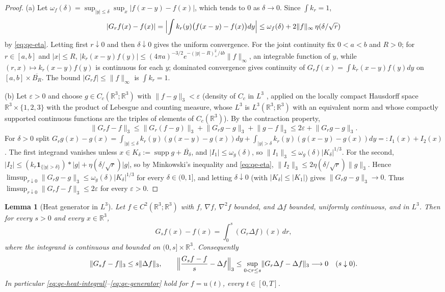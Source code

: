 \documentclass[11pt]{article}
\newtheorem{lemma}[theorem]{Lemma}
\theoremstyle{definition}
\theoremstyle{plain}
\newcommand{\R}{\mathbb R}
\newcommand{\norm}[1]{\lVert #1\rVert}
\begin{document}
\begin{proof}
(a) Let $\omega_f(\delta)=\sup_{|y|\le\delta}\sup_x|f(x-y)-f(x)|$, which
tends to $0$ as $\delta\to0$.  Since $\int k_r=1$,
\[
 |G_rf(x)-f(x)|
 =\Bigl|\int k_r(y)\bigl(f(x-y)-f(x)\bigr)dy\Bigr|
 \le\omega_f(\delta)+2\norm f_\infty\,\eta(\delta/\sqrt r)
\]
by \eqref{eq:qe-eta}.  Letting first $r\downarrow0$ and then
$\delta\downarrow0$ gives the uniform convergence.  For the joint
continuity fix $0<a<b$ and $R>0$; for $r\in[a,b]$ and $|x|\le R$,
$|k_r(x-y)f(y)|\le(4\pi a)^{-3/2}e^{-(|y|-R)_+^2/4b}\norm f_\infty$, an
integrable function of $y$, while $(r,x)\mapsto k_r(x-y)f(y)$ is
continuous for each $y$; dominated convergence gives continuity of
$G_rf(x)=\int k_r(x-y)f(y)dy$ on $[a,b]\times\overline{B_R}$.  The bound
$|G_rf|\le\norm f_\infty$ is $\int k_r=1$.

(b) Let $\varepsilon>0$ and choose $g\in C_c(\R^3;\R^3)$ with
$\norm{f-g}_3<\varepsilon$ (density of $C_c$ in $L^3$
\cite[Thm.~3.14]{Rudin1987}, applied on
the locally compact Hausdorff space $\R^3\times\{1,2,3\}$ with the
product of Lebesgue and counting measure, whose $L^3$ is
$L^3(\R^3;\R^3)$ with an equivalent norm and whose compactly
supported continuous functions are the triples of elements of
$C_c(\R^3)$).  By the contraction property,
\[
 \norm{G_rf-f}_3
 \le\norm{G_r(f-g)}_3+\norm{G_rg-g}_3+\norm{g-f}_3
 \le2\varepsilon+\norm{G_rg-g}_3 .
\]
For $\delta>0$ split
$G_rg(x)-g(x)=\int_{|y|\le\delta}k_r(y)(g(x-y)-g(x))dy
+\int_{|y|>\delta}k_r(y)(g(x-y)-g(x))dy=:I_1(x)+I_2(x)$.
The first integrand vanishes unless $x\in K_\delta:=\operatorname{supp}g+\overline{B_\delta}$,
and $|I_1|\le\omega_g(\delta)$, so
$\norm{I_1}_3\le\omega_g(\delta)|K_\delta|^{1/3}$.  For the second,
$|I_2|\le(k_r\mathbf 1_{\{|y|>\delta\}})*|g|+\eta(\delta/\sqrt r)|g|$, so by
Minkowski's inequality and \eqref{eq:qe-eta},
$\norm{I_2}_3\le2\eta(\delta/\sqrt r)\norm g_3$.  Hence
$\limsup_{r\downarrow0}\norm{G_rg-g}_3\le\omega_g(\delta)|K_\delta|^{1/3}$
for every $\delta\in(0,1]$, and letting $\delta\downarrow0$ (with
$|K_\delta|\le|K_1|$) gives $\norm{G_rg-g}_3\to0$.  Thus
$\limsup_{r\downarrow0}\norm{G_rf-f}_3\le2\varepsilon$ for every
$\varepsilon>0$.
\end{proof}

\begin{lemma}[Heat generator in $L^3$]\label{lem:heat-generator}
Let $f\in C^2(\R^3;\R^3)$ with $f$, $\nabla f$, $\nabla^2f$ bounded, and
$\Delta f$ bounded, uniformly continuous, and in $L^3$.  Then for every
$s>0$ and every $x\in\R^3$,
\begin{equation}\label{eq:qe-heat-integral}
 G_sf(x)-f(x)=\int_0^s(G_r\Delta f)(x)\,dr ,
\end{equation}
where the integrand is continuous and bounded on $(0,s]\times\R^3$.
Consequently
\begin{equation}\label{eq:qe-generator}
 \norm{G_sf-f}_3\le s\norm{\Delta f}_3,
 \qquad
 \Bigl\|\frac{G_sf-f}s-\Delta f\Bigr\|_3
 \le\sup_{0<r\le s}\norm{G_r\Delta f-\Delta f}_3\longrightarrow0
 \quad(s\downarrow0).
\end{equation}
In particular \eqref{eq:qe-heat-integral}--\eqref{eq:qe-generator} hold for
$f=u(t)$, every $t\in[0,T]$.
\end{lemma}
\end{document}
